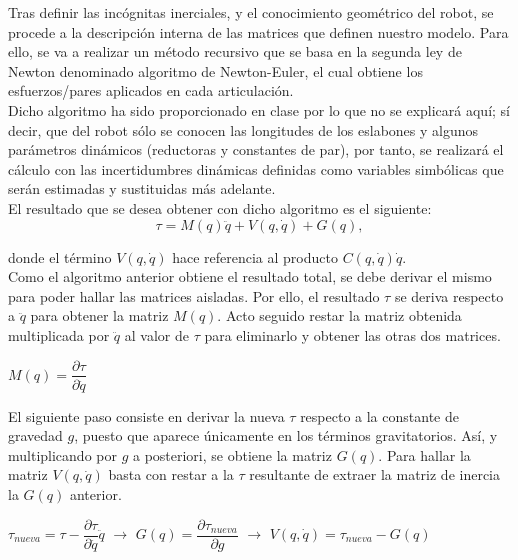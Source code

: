 Tras definir las incógnitas inerciales, y el conocimiento geométrico del robot, se procede a la descripción interna de las
matrices que definen nuestro modelo. Para ello, se va a realizar un método recursivo que se basa en la segunda ley de
Newton denominado algoritmo de Newton-Euler, el cual obtiene los esfuerzos/pares aplicados en cada articulación.\\
Dicho algoritmo ha sido proporcionado en clase por lo que no se explicará aquí; sí decir, que del robot sólo se conocen
las longitudes de los eslabones y algunos parámetros dinámicos (reductoras y constantes de par), por tanto, se realizará el cálculo
con las incertidumbres dinámicas definidas como variables simbólicas que serán estimadas y sustituidas más adelante.\\

El resultado que se desea obtener con dicho algoritmo es el siguiente:\\

\begin{equation}
\tau=M(q)\ddot{q}+V(q,\dot{q})+G(q),
\end{equation}

donde el término $V(q,\dot{q})$ hace referencia al producto $C(q,\dot{q})\dot{q}$.\\



Como el algoritmo anterior obtiene el resultado total, se debe derivar el mismo para poder hallar las matrices aisladas. Por ello, el resultado $\tau$ se deriva respecto a $\ddot{q}$ para obtener la matriz $M(q)$. Acto seguido restar la matriz obtenida multiplicada por $\ddot{q}$ al valor de $\tau$ para eliminarlo y obtener las otras dos matrices.\\

\begin{center}

	$M(q)=\dfrac{\partial{\tau}}{\partial{\ddot{q}}}$

\end{center}



El siguiente paso consiste en derivar la nueva $\tau$ respecto a la constante de gravedad $g$, puesto que aparece únicamente en los términos gravitatorios. Así, y multiplicando por $g$ a posteriori, se obtiene la matriz $G(q)$. Para hallar la matriz $V(q,\dot{q})$ basta con restar a la $\tau$ resultante de extraer la matriz de inercia la $G(q)$ anterior.\\

\begin{center}

	$\tau_{nueva}=\tau-\dfrac{\partial{\tau}}{\partial{\ddot{q}}}\ddot{q}$
	$\rightarrow$
	$G(q)=\dfrac{\partial{\tau_{nueva}}}{\partial{g}}$
	$\rightarrow$
	$V(q,\dot{q})=\tau_{nueva}-G(q)$

\end{center}



